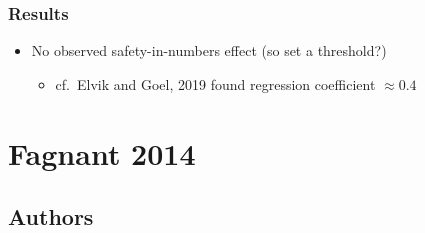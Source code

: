 \documentclass{beamer}
\begin{document}
\begin{frame}
  \frametitle{Results}
  \begin{itemize}
  \item No observed safety-in-numbers effect (so set a threshold?)
    \begin{itemize}
    \item cf.~Elvik and Goel, 2019 found regression coefficient $\approx 0.4$
    \end{itemize}
  \end{itemize}
\end{frame}



\section{Fagnant 2014}

\subsection{Authors}
\end{document}
